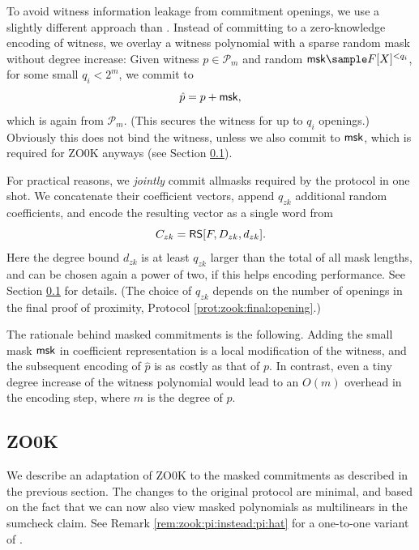To avoid witness information leakage from commitment openings, we use a slightly different approach than \cite{cryptoeprint:2026/391}.
Instead of committing to a zero-knowledge encoding of witness,
we overlay a witness polynomial with a sparse random mask without  degree increase:
Given witness $p \in \mathscr P_{m}$ and random $\msk\sample F[X]^{< q_i}$, for some small $q_i < 2^m$, we commit to
\begin{equation}
\hat p = p + \msk, %
\end{equation}
which is again from $\mathscr P_m$.
(This secures the witness for up to $q_i$ openings.)
Obviously this does not bind the witness, unless we also commit to $\mathsf{msk}$, which is required for ZO0K anyways (see Section \ref{s:zook}).

For practical reasons, we \textit{jointly} commit all\footnotemark masks required by the protocol in one shot.
%
We concatenate their coefficient vectors, append $q_{zk}$ additional random coefficients, and encode the resulting vector as a single word from 
\begin{equation}
\label{e:C:zk}
C_{zk} = \mathsf{RS}[F,D_{zk}, d_{zk}].
\end{equation}
Here the degree bound $d_{zk}$ is at least $q_{zk}$ larger than the total of all mask lengths, and can be chosen again a power of two, if this helps encoding performance.
See Section \ref{s:zook} for details.
(The choice of $q_{zk}$ depends on the number of openings in the final proof of proximity, Protocol \ref{prot:zook:final:opening}.)

The rationale behind masked commitments is the following.
Adding the small mask $\mathsf{msk}$ in coefficient representation is a local modification of the witness, and the 
subsequent encoding of $\hat p$ is as costly as that of $p$. 
In contrast, even a tiny degree increase of the witness polynomial would lead to an $O(m)$ overhead in the encoding step, where $m$ is the degree of $p$.




\subsection{ZO0K}
\label{s:zook}


We describe an adaptation of ZO0K \cite{cryptoeprint:2026/391} to the masked commitments as described in the previous section.
The changes to the original protocol are minimal, and based on the fact that we can now also view masked polynomials as multilinears in the sumcheck claim.
See Remark \ref{rem:zook:pi:instead:pi:hat} for a one-to-one variant of \cite{cryptoeprint:2026/391}.


